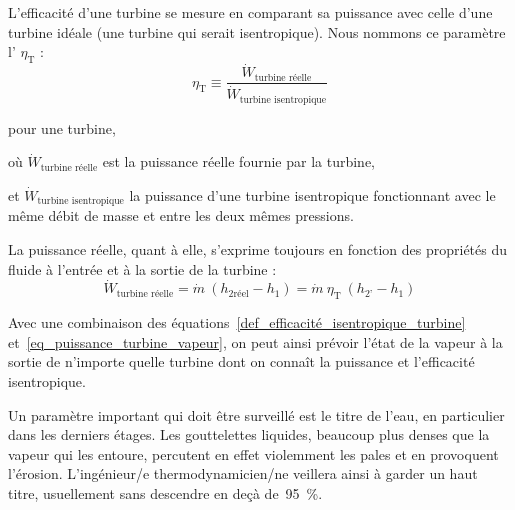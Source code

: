 		L’efficacité d’une turbine se mesure en comparant sa puissance avec celle d’une turbine idéale (une turbine qui serait isentropique). Nous nommons ce paramètre l’ $\eta_\text{T}$ :
		\begin{equation}
			\eta_\text{T} \equiv \frac{\dot{W}_\text{turbine réelle}}{\dot{W}_\text{turbine isentropique}}
			\label{def_efficacité_isentropique_turbine}
		\end{equation}
		\begin{equationterms}
			\item pour une turbine,
			\item où \tab $\dot{W}_\text{turbine réelle}$ 			\tab\tab\tab\tab\tab est la puissance réelle fournie par la turbine,
			\item et \tab $\dot{W}_\text{turbine isentropique}$ 	\tab la puissance d’une turbine isentropique fonctionnant avec le même débit de masse et entre les deux mêmes pressions.
		\end{equationterms}

		La puissance réelle, quant à elle, s’exprime toujours en fonction des propriétés du fluide à l’entrée et à la sortie de la turbine :
		\begin{equation}
			\dot{W}_\text{turbine réelle} = \dot{m} \ (h_{2 \text{réel}} - h_1) = \dot m \ \eta_\text{T} \ (h_{2’} - h_1)
			\label{eq_puissance_turbine_vapeur}
		\end{equation}

		Avec une combinaison des équations~\ref{def_efficacité_isentropique_turbine} et~\ref{eq_puissance_turbine_vapeur}, on peut ainsi prévoir l’état de la vapeur à la sortie de n’importe quelle turbine dont on connaît la puissance et l’efficacité isentropique.

		Un paramètre important qui doit être surveillé est le titre de l’eau, en particulier dans les derniers étages. Les gouttelettes liquides, beaucoup plus denses que la vapeur qui les entoure, percutent en effet violemment les pales et en provoquent l’érosion. L’ingénieur/e thermodynamicien/ne veillera ainsi à garder un haut titre, usuellement sans descendre en deçà de~\SI{95}{\percent}.

